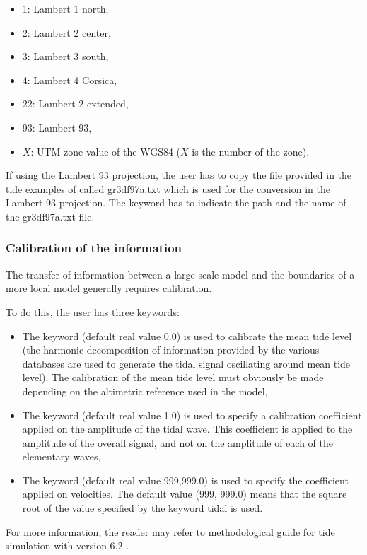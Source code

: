 \begin{itemize}
\item 1: Lambert 1 north,

\item 2: Lambert 2 center,

\item 3: Lambert 3 south,

\item 4: Lambert 4 Corsica,

\item 22: Lambert 2 extended,

\item 93: Lambert 93,

\item $X$: UTM zone value of the WGS84 ($X$ is the number of the
zone).
\end{itemize}

If using the Lambert 93 projection, the user has to copy the file provided
in the tide examples of  called gr3df97a.txt which is used
for the conversion in the Lambert 93 projection.
The keyword  has to indicate the path
and the name of the gr3df97a.txt file.

\subsubsection{Calibration of the information}

The transfer of information between a large scale model and the boundaries of
a more local model generally requires calibration.

To do this, the user has three keywords:

\begin{itemize}
\item The keyword  (default real
value 0.0) is used to calibrate the mean tide level (the harmonic decomposition
of information provided by the various databases are used to generate the tidal
signal oscillating around mean tide level). The calibration of the mean tide
level must obviously be made depending on the altimetric reference used in the
model,

\item The keyword  (default real
value 1.0) is used to specify a calibration coefficient applied on the
amplitude of the tidal wave. This coefficient is applied to the amplitude of
the overall signal, and not on the amplitude of each of the elementary waves,

\item The keyword  (default
real value 999,999.0) is used to specify the coefficient applied on velocities.
The default value (999, 999.0) means that the square root of the value
specified by the keyword  tidal is
used.
\end{itemize}

For more information, the reader may refer to methodological guide for tide
simulation with version 6.2 \cite{Pham2012}.
